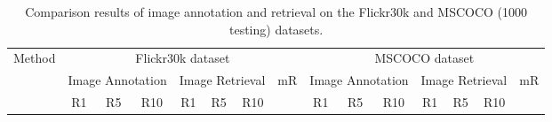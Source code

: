 \documentclass[10pt,twocolumn,letterpaper]{article}
\begin{document}
\begin{table*}[t] \small
\addtolength{\tabcolsep}{-1.5pt}
\centering
\caption{Comparison results of image annotation and retrieval on the Flickr30k and MSCOCO (1000 testing) datasets. }
\begin{tabular}{l|ccc|ccc|c|ccc|ccc|c}
\hline
\hline
\multirow{3}{0.7cm}{Method}  &  \multicolumn{7}{c|}{Flickr30k dataset} &  \multicolumn{7}{c}{MSCOCO dataset}\\
\cline{2-15}
        &  \multicolumn{3}{c|}{Image Annotation}  &  \multicolumn{3}{c|}{Image Retrieval} & \multirow{2}{0.5cm}{{mR}}
&  \multicolumn{3}{c|}{Image Annotation}  &  \multicolumn{3}{c|}{Image Retrieval} & \multirow{2}{0.5cm}{{mR}}  \\
\cline{2-7}
\cline{9-14}
     & R1 & R5  & R10   & R1 & R5  & R10  &
&R1 & R5  & R10   & R1 & R5  & R10  &    \\
\hline



\end{tabular}
\end{table*}
\end{document}
